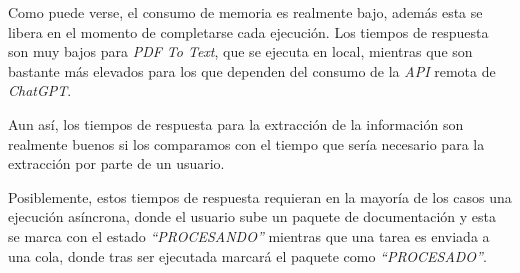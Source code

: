 Como puede verse, el consumo de memoria es realmente bajo, además esta se libera en el momento de completarse cada
ejecución.
Los tiempos de respuesta son muy bajos para \textit{PDF To Text}, que se ejecuta en local, mientras que son bastante
más elevados para los que dependen del consumo de la \textit{API} remota de \textit{ChatGPT}.

Aun así, los tiempos de respuesta para la extracción de la información son realmente buenos si los comparamos con el
tiempo que sería necesario para la extracción por parte de un usuario.

Posiblemente, estos tiempos de respuesta requieran en la mayoría de los casos una ejecución asíncrona, donde el usuario
sube un paquete de documentación y esta se marca con el estado \textit{``PROCESANDO''} mientras que una tarea es
enviada a una cola, donde tras ser ejecutada marcará el paquete como \textit{``PROCESADO''}.
